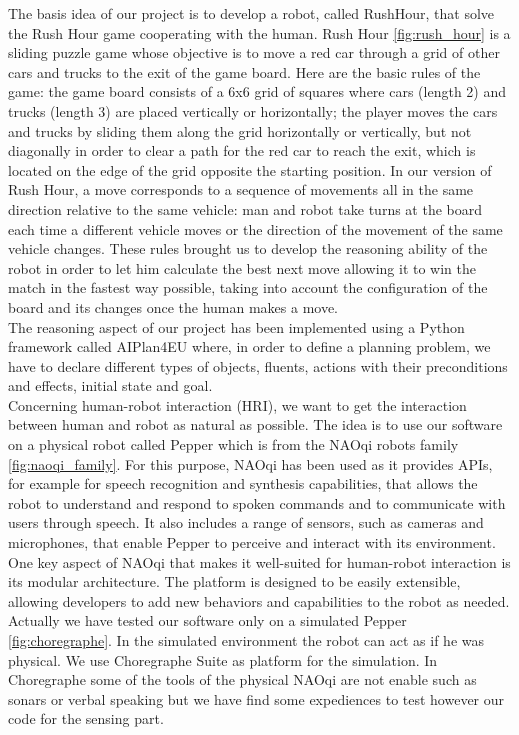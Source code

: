 \documentclass{article}
\begin{document}
\indent The basis idea of our project is to develop a robot, called RushHour, that solve the Rush Hour game cooperating with the human. Rush Hour \ref{fig:rush_hour} is a sliding puzzle game whose objective is to move a red car through a grid of other cars and trucks to the exit of the game board. Here are the basic rules of the game: the game board consists of a 6x6 grid of squares where cars (length 2) and trucks (length 3) are placed vertically or horizontally; the player moves the cars and trucks by sliding them along the grid horizontally or vertically, but not diagonally in order to clear a path for the red car to reach the exit, which is located on the edge of the grid opposite the starting position. In our version of Rush Hour, a move corresponds to a sequence of movements all in the same direction relative to the same vehicle: man and robot take turns at the board each time a different vehicle moves or the direction of the movement of the same vehicle changes.
\noindent These rules brought us to develop the reasoning ability of the robot in order to let him calculate the best next move allowing it to win the match in the fastest way possible, taking into account the configuration of the board and its changes once the human makes a move. \\
\indent The reasoning aspect of our project has been implemented using a Python framework called AIPlan4EU \cite{aiplan4eu} where, in order to define a planning problem, we have to declare different types of objects, fluents, actions with their preconditions and effects, initial state and goal.\\
\indent Concerning human-robot interaction (HRI), we want to get the interaction between human and robot as natural as possible. The idea is to use our software on a physical robot called Pepper \cite{pepper} which is from the NAOqi robots family \cite{naoqi} \ref{fig:naoqi_family}.
For this purpose, NAOqi has been used as it provides APIs, for example for speech recognition and synthesis capabilities, that allows the robot to understand and respond to spoken commands and to communicate with users through speech. It also includes a range of sensors, such as cameras and microphones, that enable Pepper to perceive and interact with its environment. One key aspect of NAOqi that makes it well-suited for human-robot interaction is its modular architecture. The platform is designed to be easily extensible, allowing developers to add new behaviors and capabilities to the robot as needed.
\noindent Actually we have tested our software only on a simulated Pepper \ref{fig:choregraphe}. In the simulated environment the robot can act as if he was physical. We use Choregraphe Suite \cite{choregraphe} as platform for the simulation. In Choregraphe some of the tools of the physical NAOqi are not enable such as sonars or verbal speaking but we have find some expediences to test however our code for the sensing part.
\end{document}
